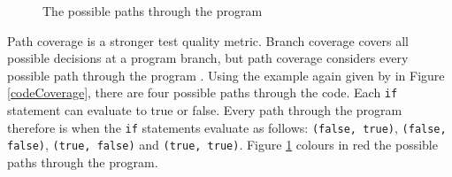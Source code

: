 \begin{figure}
    \caption{The possible paths through the program}%
    \label{programPaths}%
\end{figure}

Path coverage is a stronger test quality metric. Branch coverage covers all possible decisions at a program branch, but path coverage considers every possible path through the program \citep{Myers:2004:AST:983238, softwareTestingIntro}. Using the example again given by \citet{Myers:2004:AST:983238} in Figure \ref{codeCoverage}, there are four possible paths through the code. Each \verb+if+ statement can evaluate to true or false. Every path through the program therefore is when the \verb+if+ statements evaluate as follows: \verb+(false, true)+, \verb+(false, false)+, \verb+(true, false)+ and \verb+(true, true)+. Figure \ref{programPaths} colours in red the possible paths through the program.

